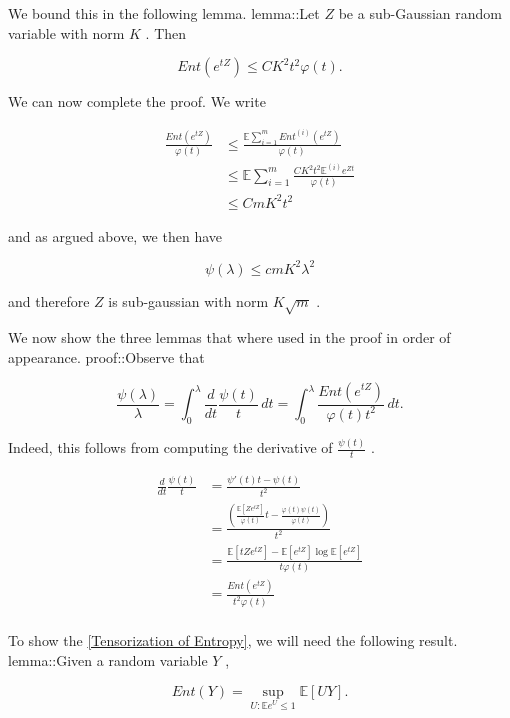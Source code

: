 \documentclass{article}
\begin{document}
We bound this in the following lemma. lemma::Let  $Z$  be a sub-Gaussian random variable with norm  $K$ . Then


\begin{equation*}
Ent(e^{tZ}) \leq CK^2 t^2 \varphi(t).
\end{equation*}

 We can now complete the proof. We write


\begin{align*}
\frac{Ent(e^{tZ})}{\varphi(t)} &\leq \frac{\mathbb{E}\sum_{i=1}^m Ent^{(i)}(e^{tZ})}{\varphi(t)}\\
& \leq \mathbb{E} \sum_{i=1}^m \frac{CK^2t^2\mathbb{E}^{(i)}e^{Zt}}{\varphi(t)} \\
& \leq CmK^2 t^2
\end{align*}

and as argued above, we then have


\begin{equation*}
\psi(\lambda) \leq c m K^2 \lambda^2
\end{equation*}

and therefore  $Z$  is sub-gaussian with norm  $K \sqrt{ m }$ .

 We now show the three lemmas that where used in the proof in order of appearance. proof::Observe that


\begin{equation*}
\frac{\psi(\lambda)}{\lambda} = \int_0^\lambda \frac{d}{dt} \frac{\psi(t)}{t} \, dt = \int_0^\lambda  \frac{Ent(e^{tZ})}{\varphi(t)t^2}  \, dt.
\end{equation*}

Indeed, this follows from computing the derivative of  $\frac{\psi(t)}{t}$ .


\begin{align*}
\frac{d}{dt} \frac{\psi(t)}{t} &= \frac{\psi'(t)t - \psi(t)}{t^2}\\
&= \frac{\left( \frac{\mathbb{E}[Ze^{tZ}]}{\varphi(t)}t - \frac{\varphi(t)\psi(t)}{\varphi(t)} \right)}{t^2}\\
&= \frac{\mathbb{E}[tZe^{tZ}] - \mathbb{E}[e^{tZ}] \log \mathbb{E}[e^{tZ}]}{t\varphi(t)} \\
&= \frac{Ent(e^{tZ})}{t^2 \varphi(t)}\\
\end{align*}

 To show the \autoref{Tensorization of Entropy}, we will need the following result. lemma::Given a random variable  $Y$ ,


\begin{equation*}
Ent(Y) = \sup_{U: \mathbb{E} e^U \leq 1}\mathbb{E}[UY].
\end{equation*}
\end{document}
